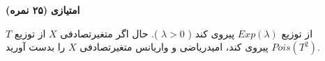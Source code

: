 \Large \textbf{
امتیازی
}
\large \textbf{(۲۵ نمره)}

\normalsize \vspace{0.5cm}

 
$T$
از توزیع
$Exp(\lambda)$
پیروی کند 
(
$\lambda>0$
).
حال اگر متغیرتصادفی
$X$
از توزیع 
$Pois(T^2)$
پیروی کند،
امیدریاضی و واریانس متغیرتصادفی
$X$
را بدست آورید.



